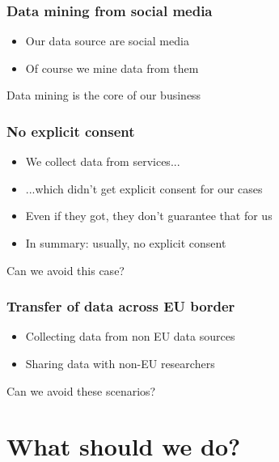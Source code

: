\documentclass[17pt,aspectratio=169,hyperref={pdfusetitle,colorlinks,allcolors=olive}]{beamer}
\begin{document}
\begin{frame}[fragile]
  \frametitle{Data mining from social media}

  \begin{itemize}
  \item Our data source are social media
  \item Of course we mine data from them
  \end{itemize}

  \begin{flushright}
    Data mining is the core of our business
  \end{flushright}
\end{frame}

\begin{frame}[fragile]
  \frametitle{No explicit consent}

  \begin{itemize}
  \item We collect data from services...
  \item ...which didn't get explicit consent for our cases
  \item Even if they got, they don't guarantee that for us
  \item In summary: usually, no explicit consent
  \end{itemize}

  \begin{flushright}
    Can we avoid this case?
  \end{flushright}
\end{frame}

\begin{frame}[fragile]
  \frametitle{Transfer of data across EU border}

  \begin{itemize}
  \item Collecting data from non EU data sources
  \item Sharing data with non-EU researchers
  \end{itemize}

  \begin{flushright}
    Can we avoid these scenarios?
  \end{flushright}
\end{frame}

\section{What should we do?}
\end{document}
